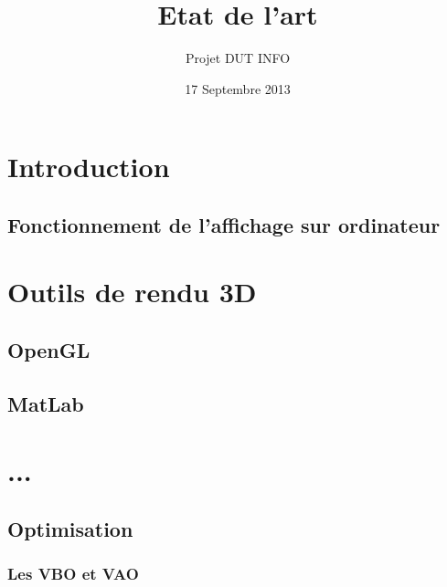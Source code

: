 \documentclass{report}
\title{Etat de l'art}
\author{Projet DUT INFO}
\date{17 Septembre 2013}
\begin{document}
\maketitle

\hypertarget{tableofcontents}{} %
\tableofcontents

\part{Introduction}

\chapter{Fonctionnement de l'affichage sur ordinateur}


\part{Outils de rendu 3D}

\chapter{OpenGL}


\chapter{MatLab}


\part{...}
\chapter{Optimisation}
\section{Les VBO et VAO}


\newpage
\end{document}
